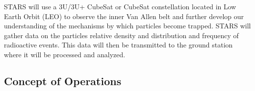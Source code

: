 \documentclass[3p]{elsarticle}
\begin{document}
STARS will use a 3U/3U+ CubeSat or CubeSat constellation located in Low Earth Orbit (LEO) to observe the inner Van Allen belt and further develop our understanding of the mechanisms by which particles become trapped. STARS will gather data on the particles relative density and distribution and frequency of radioactive events. This data will then be transmitted to the ground station where it will be processed and analyzed.

\subsection{Concept of Operations}
\end{document}
